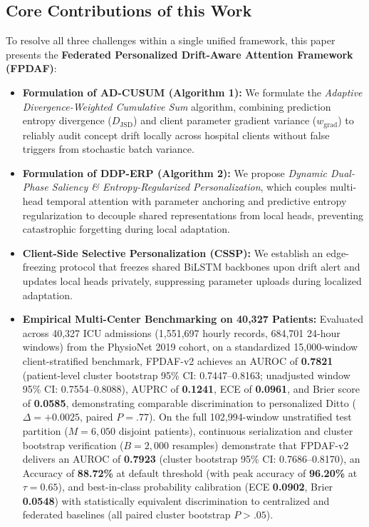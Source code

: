\documentclass[10pt,a4paper,twocolumn,twoside]{article}
\begin{document}
\subsection{Core Contributions of this Work}
To resolve all three challenges within a single unified framework, this paper presents the \textbf{Federated Personalized Drift-Aware Attention Framework (FPDAF)}:
\begin{itemize}
    \item \textbf{Formulation of AD-CUSUM (Algorithm 1):} We formulate the \textit{Adaptive Divergence-Weighted Cumulative Sum} algorithm, combining prediction entropy divergence ($D_{\text{JSD}}$) and client parameter gradient variance ($w_{\text{grad}}$) to reliably audit concept drift locally across hospital clients without false triggers from stochastic batch variance.
    \item \textbf{Formulation of DDP-ERP (Algorithm 2):} We propose \textit{Dynamic Dual-Phase Saliency \& Entropy-Regularized Personalization}, which couples multi-head temporal attention with parameter anchoring and predictive entropy regularization to decouple shared representations from local heads, preventing catastrophic forgetting during local adaptation.
    \item \textbf{Client-Side Selective Personalization (CSSP):} We establish an edge-freezing protocol that freezes shared BiLSTM backbones upon drift alert and updates local heads privately, suppressing parameter uploads during localized adaptation.
        \item \textbf{Empirical Multi-Center Benchmarking on 40,327 Patients:} Evaluated across 40,327 ICU admissions (1,551,697 hourly records, 684,701 24-hour windows) from the PhysioNet 2019 cohort, on a standardized 15,000-window client-stratified benchmark, FPDAF-v2 achieves an AUROC of \textbf{0.7821} (patient-level cluster bootstrap 95\% CI: 0.7447--0.8163; unadjusted window 95\% CI: 0.7554--0.8088), AUPRC of \textbf{0.1241}, ECE of \textbf{0.0961}, and Brier score of \textbf{0.0585}, demonstrating comparable discrimination to personalized Ditto ($\Delta = +0.0025$, paired $P = .77$). On the full 102,994-window unstratified test partition ($M=6,050$ disjoint patients), continuous serialization and cluster bootstrap verification ($B=2,000$ resamples) demonstrate that FPDAF-v2 delivers an AUROC of \textbf{0.7923} (cluster bootstrap 95\% CI: 0.7686--0.8170), an Accuracy of \textbf{88.72\%} at default threshold (with peak accuracy of \textbf{96.20\%} at $\tau=0.65$), and best-in-class probability calibration (ECE \textbf{0.0902}, Brier \textbf{0.0548}) with statistically equivalent discrimination to centralized and federated baselines (all paired cluster bootstrap $P > .05$).

\end{itemize}
\end{document}
